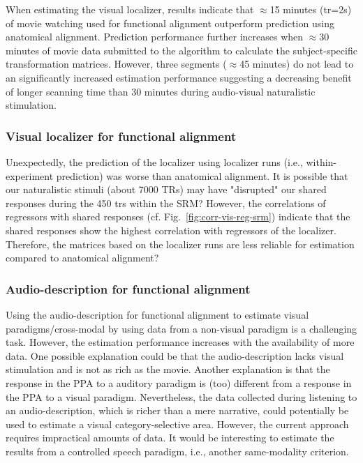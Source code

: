 %
When estimating the visual localizer, results indicate that $\approx$15 minutes
(\ac{tr}=2s) of movie watching used for functional alignment outperform
prediction using anatomical alignment.
%
Prediction performance further increases when $\approx$30 minutes of movie data
submitted to the algorithm to calculate the subject-specific transformation
matrices.
%
However, three segments ($\approx$45 minutes) do not lead to an significantly
increased estimation performance suggesting a decreasing benefit of longer
scanning time than 30 minutes during audio-visual naturalistic stimulation.



\subsubsection{Visual localizer for functional alignment}



%
Unexpectedly, the prediction of the localizer using localizer runs (i.e.,
within-experiment prediction) was worse than anatomical alignment.
%
It is possible that our naturalistic stimuli (about 7000 TRs) may have
"disrupted" our shared responses during the 450 \acp{tr} within the SRM?
%
However, the correlations of regressors with shared responses (cf.
Fig.~\ref{fig:corr-vis-reg-srm}) indicate that the shared responses show the
highest correlation with regressors of the localizer.
%
Therefore, the matrices based on the localizer runs are less reliable for
estimation compared to anatomical alignment?



\subsubsection{Audio-description for functional alignment}


%
Using the audio-description for functional alignment to estimate visual
paradigms/cross-modal by using data from a non-visual paradigm is a challenging
task.
%
However, the estimation performance increases with the availability of
more data.
%
One possible explanation could be that the audio-description lacks visual
stimulation and is not as rich as the movie.
%
Another explanation is that the response in the PPA to a auditory paradigm is
(too) different from a response in the PPA to a visual paradigm.
%
Nevertheless, the data collected during listening to an audio-description, which
is richer than a mere narrative, could potentially be used to estimate a visual
category-selective area. However, the current approach requires impractical
amounts of data.
%
It would be interesting to estimate the results from a controlled speech
paradigm, i.e., another same-modality criterion.


